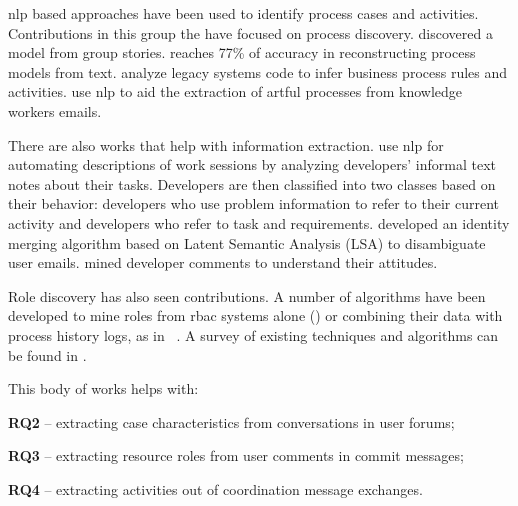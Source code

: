 

\gls{nlp} based approaches have been used to identify process cases and activities. Contributions in this group the have focused on process discovery. \citep{Goncalves2009a} discovered a model from group stories. \citep{Friedrich2011} reaches 77\% of accuracy in reconstructing process models from text. \citep{DoNascimento2012} analyze legacy systems code to infer business process rules and activities. \citep{DiCiccio2013} use \gls{nlp} to aid the extraction of artful processes from knowledge workers emails.

There are also works that help with information extraction. \citep{Maalej2010} use \gls{nlp} for automating descriptions of work sessions by analyzing developers' informal text notes about their tasks. Developers are then classified into two classes based on their behavior: developers who use problem information to refer to their current activity and developers who refer to task and requirements. \citep{Kouters2012} developed an identity merging algorithm based on Latent Semantic Analysis (LSA) to disambiguate user emails. \citep{Licorish2014} mined developer comments to understand their attitudes.

Role discovery has also seen contributions. A number of algorithms have been developed to mine roles from \gls{rbac} systems alone (\citep{Lu2015,frank2013role}) or combining their data with process history logs, as in ~\citep{baumgrass2012deriving}. A survey of existing techniques and algorithms can be found in \citep{Mitra2016}.

This body of works 
helps with:
\begin{inparaenum}[\itshape i)]
	\item \textbf{RQ2} -- extracting case characteristics from conversations in user forums;
	\item \textbf{RQ3} -- extracting resource roles from user comments in commit messages;
	\item \textbf{RQ4} -- extracting activities out of coordination message exchanges.
\end{inparaenum} 

